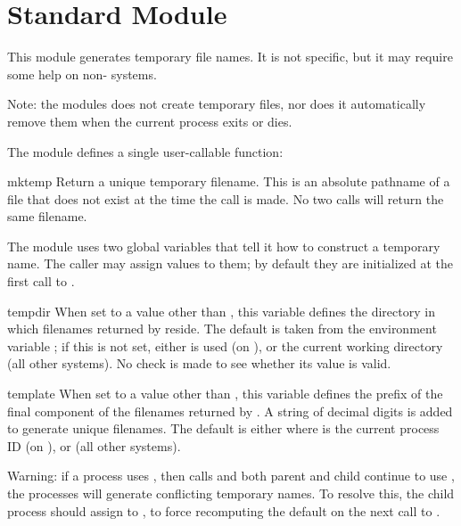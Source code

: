 \section{Standard Module }
\label{module-tempfile}


This module generates temporary file names.  It is not \UNIX{} specific,
but it may require some help on non-\UNIX{} systems.

Note: the modules does not create temporary files, nor does it
automatically remove them when the current process exits or dies.

The module defines a single user-callable function:

\begin{funcdesc}{mktemp}{}
Return a unique temporary filename.  This is an absolute pathname of a
file that does not exist at the time the call is made.  No two calls
will return the same filename.
\end{funcdesc}

The module uses two global variables that tell it how to construct a
temporary name.  The caller may assign values to them; by default they
are initialized at the first call to .

\begin{datadesc}{tempdir}
When set to a value other than , this variable defines the
directory in which filenames returned by  reside.  The
default is taken from the environment variable ; if this
is not set, either  is used (on \UNIX{}), or the current
working directory (all other systems).  No check is made to see
whether its value is valid.
\end{datadesc}

\begin{datadesc}{template}
When set to a value other than , this variable defines the
prefix of the final component of the filenames returned by
.  A string of decimal digits is added to generate
unique filenames.  The default is either  where
 is the current process ID (on \UNIX{}), or  (all
other systems).
\end{datadesc}

Warning: if a \UNIX{} process uses , then calls
 and both parent and child continue to use
, the processes will generate conflicting temporary
names.  To resolve this, the child process should assign 
to , to force recomputing the default on the next call
to .
